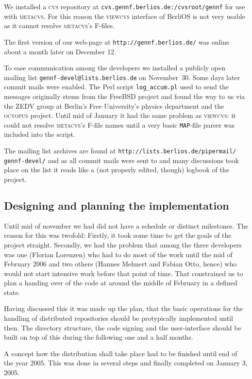 \documentclass[fleqn, 10pt, a4paper]{report} \usepackage{amssymb}
\begin{document}
We installed a \textsc{cvs} repository at
\texttt{cvs.gennf.berlios.de:/cvsroot/gennf} for use with
\textsc{metacvs}. For this reason the \textsc{viewcvs} interface of
BerliOS is not very usable as it cannot resolve \textsc{metacvs}'s
F-files.

The first version of our web-page at \texttt{http://gennf.berlios.de/}
was online about a month later on December 12.

To ease communication among the developers we installed a publicly
open mailing list \texttt{gennf-devel@lists.berlios.de} on
November~30. Some days later commit mails were enabled.  The Perl
script \texttt{log\_accum.pl} used to send the messages originally
stems from the FreeBSD project and found the way to us via the ZEDV
group at Berlin's Free University's physics department and the
\textsc{octopus} project.  Until mid of January it had the same
problem as \textsc{viewcvs}: it could not resolve \textsc{metacvs}'s
F-file names until a very basic \texttt{MAP}-file parser was included
into the script.

The mailing list archives are found at
\texttt{http://lists.berlios.de/pipermail/ gennf-devel/} and as all
commit mails were sent to and many discussions took place on the list
it reads like a (not properly edited, though) logbook of the project.


\subsection{Designing and planning the implementation}

Until mid of november we had did not have a schedule or distinct
milestones. The reason for this was twofold: Firstly, it took some
time to get the goals of the project straight. Secondly, we had the
problem that among the three developers was one (Florian Lorenzen) who
had to do most of the work until the mid of February 2006 and two
others (Hannes Mehnert and Fabian Otto, hence) who would not start
intensive work before that point of time. That constrained us to plan
a handing over of the code at around the middle of February in a
defined state.

Having discussed this it was made up the plan, that the basic
operations for the handling of distributed repositories should be
protypically implemented until then. The directory structure, the code
signing and the user-interface should be built on top of this during the
following one and a half months.

A concept how the distribution shall take place had to be finished
until end of the year 2005. This was done in several steps and finally
completed on January 3, 2005.
\end{document}
